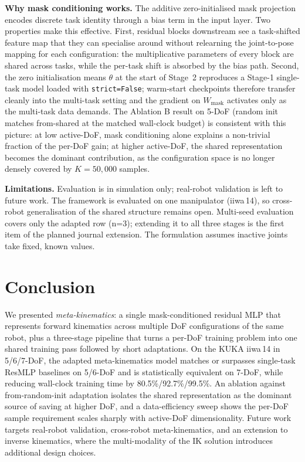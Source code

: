 \documentclass[conference]{IEEEtran}
\begin{document}
\textbf{Why mask conditioning works.} The additive zero-initialised mask projection encodes discrete task identity through a bias term in the input layer. Two properties make this effective. First, residual blocks downstream see a task-shifted feature map that they can specialise around without relearning the joint-to-pose mapping for each configuration: the multiplicative parameters of every block are shared across tasks, while the per-task shift is absorbed by the bias path. Second, the zero initialisation means $\theta$ at the start of Stage~2 reproduces a Stage-1 single-task model loaded with \texttt{strict=False}; warm-start checkpoints therefore transfer cleanly into the multi-task setting and the gradient on $W_{\mathrm{mask}}$ activates only as the multi-task data demands. The Ablation B result on 5-DoF (random init matches from-shared at the matched wall-clock budget) is consistent with this picture: at low active-DoF, mask conditioning alone explains a non-trivial fraction of the per-DoF gain; at higher active-DoF, the shared representation becomes the dominant contribution, as the configuration space is no longer densely covered by $K\!=\!50{,}000$ samples.

\textbf{Limitations.} Evaluation is in simulation only; real-robot validation is left to future work. The framework is evaluated on one manipulator (iiwa\,14), so cross-robot generalisation of the shared structure remains open. Multi-seed evaluation covers only the adapted row (n=3); extending it to all three stages is the first item of the planned journal extension. The formulation assumes inactive joints take fixed, known values.

\section{Conclusion}\label{sec:conclusion}

We presented \emph{meta-kinematics}: a single mask-conditioned residual MLP that represents forward kinematics across multiple DoF configurations of the same robot, plus a three-stage pipeline that turns a per-DoF training problem into one shared training pass followed by short adaptations. On the KUKA iiwa\,14 in 5/6/7-DoF, the adapted meta-kinematics model matches or surpasses single-task ResMLP baselines on 5/6-DoF and is statistically equivalent on 7-DoF, while reducing wall-clock training time by 80.5\%/92.7\%/99.5\%. An ablation against from-random-init adaptation isolates the shared representation as the dominant source of saving at higher DoF, and a data-efficiency sweep shows the per-DoF sample requirement scales sharply with active-DoF dimensionality. Future work targets real-robot validation, cross-robot meta-kinematics, and an extension to inverse kinematics, where the multi-modality of the IK solution introduces additional design choices.
\end{document}
